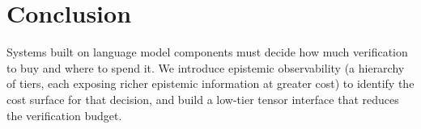 \section{Conclusion}\label{sec:conclusion}

Systems built on language model components must decide how much
verification to buy and where to spend it.
We introduce epistemic observability (a hierarchy of tiers, each exposing
richer epistemic information at greater cost) to identify the cost surface
for that decision, and build a low-tier tensor interface that reduces the
verification budget.
